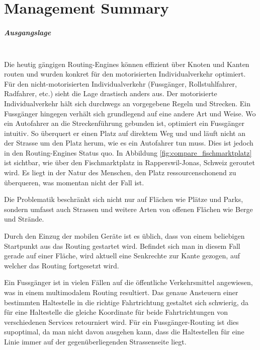 
\chapter*{Management Summary}

\paragraph{Ausgangslage}~\\
Die heutig gängigen Routing-Engines können effizient über Knoten und Kanten routen und wurden konkret für den motorisierten Individualverkehr optimiert. Für den nicht-motorisierten Individualverkehr (Fussgänger, Rollstuhlfahrer, Radfahrer, etc.) sieht die Lage drastisch anders aus. Der motorisierte Individualverkehr hält sich durchwegs an vorgegebene Regeln und Strecken. Ein Fussgänger hingegen verhält sich grundlegend auf eine andere Art und Weise. Wo ein Autofahrer an die Streckenführung gebunden ist, optimiert ein Fussgänger intuitiv. So überquert er einen Platz auf direktem Weg und und läuft nicht an der Strasse um den Platz herum, wie es ein Autofahrer tun muss. Dies ist jedoch in den Routing-Engines Status quo. In Abbildung \ref{fig:compare_fischmarktplatz} ist sichtbar, wie über den Fischmarktplatz in Rapperswil-Jonas, Schweiz geroutet wird. Es liegt in der Natur des Menschen, den Platz ressourcenschonend zu überqueren, was momentan nicht der Fall ist.

Die Problematik beschränkt sich nicht nur auf Flächen wie Plätze und Parks, sondern umfasst auch Strassen und weitere Arten von offenen Flächen wie Berge und Strände.

Durch den Einzug der mobilen Geräte ist es üblich, dass von einem beliebigen Startpunkt aus das Routing gestartet wird. Befindet sich man in diesem Fall gerade auf einer Fläche, wird aktuell eine Senkrechte zur Kante gezogen, auf welcher das Routing fortgesetzt wird.

Ein Fussgänger ist in vielen Fällen auf die öffentliche Verkehrsmittel angewiesen, was in einem multimodalem Routing resultiert. Das genaue Ansteuern einer bestimmten Haltestelle in die richtige Fahrtrichtung gestaltet sich schwierig, da für eine Haltestelle die gleiche Koordinate für beide Fahrtrichtungen von verschiedenen Services retourniert wird. Für ein Fussgänger-Routing ist dies supoptimal, da man nicht davon ausgehen kann, dass die Haltestellen für eine Linie immer auf der gegenüberliegenden Strassenseite liegt.

